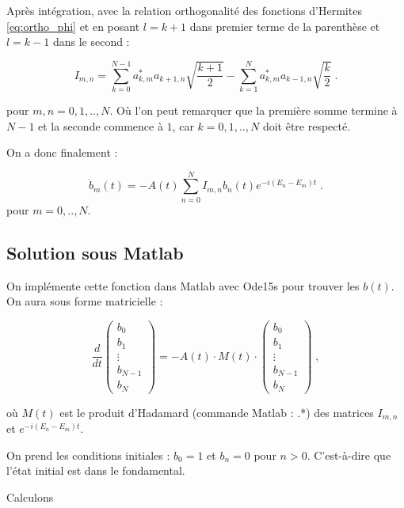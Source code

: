 \documentclass{report}
\begin{document}
Après intégration, avec la relation orthogonalité des fonctions d'Hermites \eqref{eq:ortho_phi} et en posant $l =k+1$ dans premier terme de la parenthèse et $l =k-1$ dans le second :

\begin{equation}
I_{m,n} = \sum_{k=0}^{N-1} a_{k,m}^{\ast}  a_{k+1,n} \sqrt{\frac{k+1}{2}}- \sum_{k=1}^{N} a_{k,m}^{\ast}a_{k-1,n}\sqrt{\frac{k}{2}}\;.
\end{equation}

pour $m,n = 0,1,..,N$. Où l'on peut remarquer que la première somme termine à $N-1$ et la seconde commence à $1$, car $k =0,1,..,N$ doit être respecté.

On a donc finalement :

\begin{equation}
\dot{b}_{m}(t) = - A(t) \sum_{n=0}^{N}I_{m,n}b_{n}(t) e^{-i(E_{n}-E_{m})t}\;.
\end{equation}
pour $m=0,..,N$.

\subsection{Solution sous Matlab}

On implémente cette fonction dans Matlab avec Ode15s pour trouver les $b(t)$. On aura sous forme matricielle :

\begin{equation}
\frac{d}{dt}
\begin{pmatrix}
 b_{0}\\ 
 b_{1}\\ 
 \vdots\\ 
 b_{N-1}\\ 
  b_{N}
\end{pmatrix} = -A(t) \cdot M(t) \cdot 
\begin{pmatrix}
 b_{0}\\ 
 b_{1}\\ 
 \vdots\\ 
 b_{N-1}\\ 
  b_{N}
\end{pmatrix}\;,
\end{equation}

où $M(t)$ est le produit d'Hadamard (commande Matlab : .*) des matrices $I_{m,n}$ et $e^{-i(E_{n}-E_{m})t}$. 

On prend les conditions initiales : $b_{0}=1$ et $b_{n}=0$ pour $n > 0$. C'est-à-dire que l'état initial est dans le fondamental.


Calculons 
\end{document}
